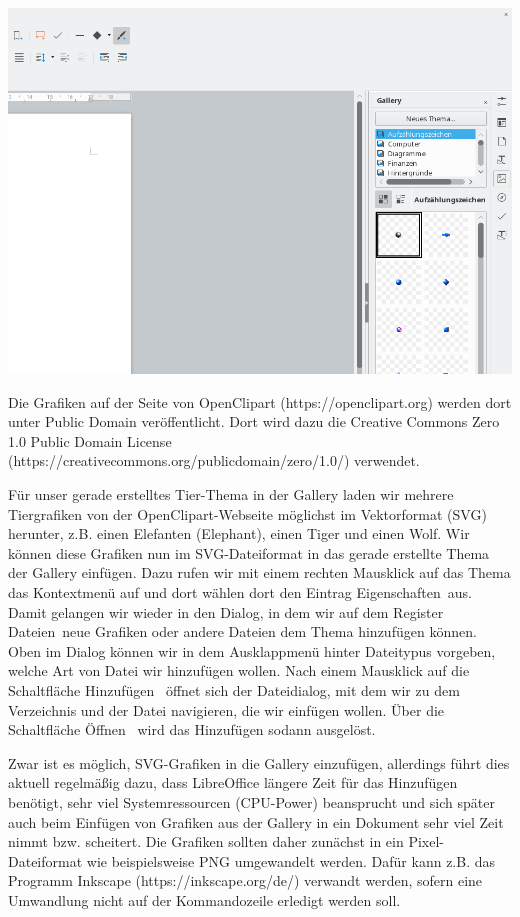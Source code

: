 \documentclass[a4paper,10pt,pagesize,titlepage]{scrbook}
\begin{document}
\begin{center}
	\includegraphics[width=0.9\linewidth]{pics/libreoffice_gallery}
	\label{fig:libreoffice_gallery}
\end{center}


Die Grafiken auf der Seite von OpenClipart (https://openclipart.org) werden dort unter Public Domain veröffentlicht. Dort wird dazu die Creative Commons Zero 1.0 Public Domain License (https://creativecommons.org/publicdomain/zero/1.0/) verwendet.

Für unser gerade erstelltes Tier-Thema  in der Gallery laden wir mehrere Tiergrafiken von der OpenClipart-Webseite möglichst im Vektorformat (SVG) herunter, z.B. einen Elefanten (Elephant), einen Tiger und einen Wolf. Wir können diese Grafiken nun im SVG-Dateiformat in das gerade erstellte Thema der Gallery einfügen. Dazu rufen wir mit einem rechten Mausklick auf das Thema das Kontextmenü auf und dort wählen dort den Eintrag \glqq Eigenschaften\grqq~aus. Damit gelangen wir wieder in den Dialog, in dem wir auf dem Register \glqq Dateien\grqq~neue Grafiken oder andere Dateien dem Thema hinzufügen können. Oben im Dialog können wir in dem Ausklappmenü hinter Dateitypus vorgeben, welche Art von Datei wir hinzufügen wollen. Nach einem Mausklick auf die Schaltfläche \glqq Hinzufügen\grqq~ öffnet sich der Dateidialog, mit dem wir zu dem Verzeichnis und der Datei navigieren, die wir einfügen wollen. Über die Schaltfläche \glqq Öffnen\grqq~ wird das Hinzufügen sodann ausgelöst.

Zwar ist es möglich, SVG-Grafiken in die Gallery einzufügen, allerdings führt dies aktuell regelmäßig dazu, dass LibreOffice längere Zeit für das Hinzufügen benötigt, sehr viel Systemressourcen (CPU-Power) beansprucht und sich später auch beim Einfügen von Grafiken aus der Gallery in ein Dokument sehr viel Zeit nimmt bzw. scheitert. Die Grafiken sollten daher zunächst in ein Pixel-Dateiformat wie beispielsweise PNG umgewandelt werden. Dafür kann z.B. das Programm Inkscape (https://inkscape.org/de/) verwandt werden, sofern eine Umwandlung nicht auf der Kommandozeile erledigt werden soll.
\end{document}
